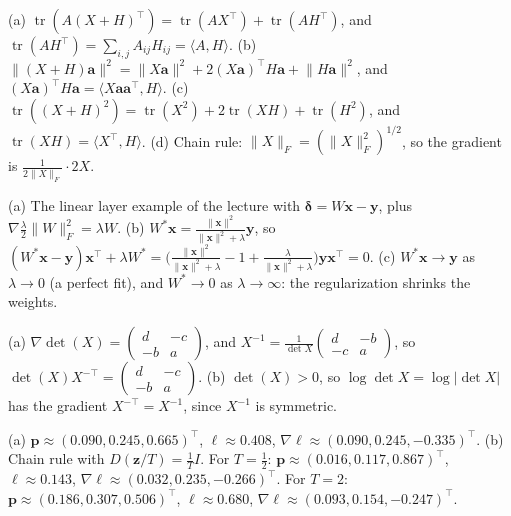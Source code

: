 \documentclass[11pt]{article}
\newcommand{\norm}[1]{\lVert #1 \rVert}
\newcommand{\ip}[2]{\langle #1, #2 \rangle}
\DeclareMathOperator{\tr}{tr}
\begin{document}
\begin{description}[leftmargin=0pt, itemsep=0.3em]
    \item[\ref{pr:matrix-grads}.] (a) $\tr(A(X + H)^\top) = \tr(AX^\top) + \tr(AH^\top)$, and $\tr(AH^\top) = \sum_{i, j} A_{ij}H_{ij} = \ip{A}{H}$. (b) $\norm{(X + H)\mathbf{a}}^2 = \norm{X\mathbf{a}}^2 + 2(X\mathbf{a})^\top H\mathbf{a} + \norm{H\mathbf{a}}^2$, and $(X\mathbf{a})^\top H\mathbf{a} = \ip{X\mathbf{a}\mathbf{a}^\top}{H}$. (c) $\tr((X + H)^2) = \tr(X^2) + 2\tr(XH) + \tr(H^2)$, and $\tr(XH) = \ip{X^\top}{H}$. (d) Chain rule: $\norm{X}_F = (\norm{X}_F^2)^{1/2}$, so the gradient is $\frac{1}{2\norm{X}_F} \cdot 2X$.
    \item[\ref{pr:regularized-layer}.] (a) The linear layer example of the lecture with $\boldsymbol{\delta} = W\mathbf{x} - \mathbf{y}$, plus $\nabla\frac{\lambda}{2}\norm{W}_F^2 = \lambda W$. (b) $W^*\mathbf{x} = \frac{\norm{\mathbf{x}}^2}{\norm{\mathbf{x}}^2 + \lambda}\mathbf{y}$, so $(W^*\mathbf{x} - \mathbf{y})\mathbf{x}^\top + \lambda W^* = \big(\frac{\norm{\mathbf{x}}^2}{\norm{\mathbf{x}}^2 + \lambda} - 1 + \frac{\lambda}{\norm{\mathbf{x}}^2 + \lambda}\big)\mathbf{y}\mathbf{x}^\top = 0$. (c) $W^*\mathbf{x} \to \mathbf{y}$ as $\lambda \to 0$ (a perfect fit), and $W^* \to 0$ as $\lambda \to \infty$: the regularization shrinks the weights.
    \item[\ref{pr:det-2x2}.] (a) $\nabla\det(X) = \begin{pmatrix} d & -c \\ -b & a \end{pmatrix}$, and $X^{-1} = \frac{1}{\det X}\begin{pmatrix} d & -b \\ -c & a \end{pmatrix}$, so $\det(X)X^{-\top} = \begin{pmatrix} d & -c \\ -b & a \end{pmatrix}$. (b) $\det(X) > 0$, so $\log\det X = \log|\det X|$ has the gradient $X^{-\top} = X^{-1}$, since $X^{-1}$ is symmetric.
    \item[\ref{pr:softmax-temperature}.] (a) $\mathbf{p} \approx (0.090, 0.245, 0.665)^\top$, $\ell \approx 0.408$, $\nabla\ell \approx (0.090, 0.245, -0.335)^\top$. (b) Chain rule with $D(\mathbf{z}/T) = \frac{1}{T}I$. For $T = \frac{1}{2}$: $\mathbf{p} \approx (0.016, 0.117, 0.867)^\top$, $\ell \approx 0.143$, $\nabla\ell \approx (0.032, 0.235, -0.266)^\top$. For $T = 2$: $\mathbf{p} \approx (0.186, 0.307, 0.506)^\top$, $\ell \approx 0.680$, $\nabla\ell \approx (0.093, 0.154, -0.247)^\top$.
\end{description}
\end{document}
